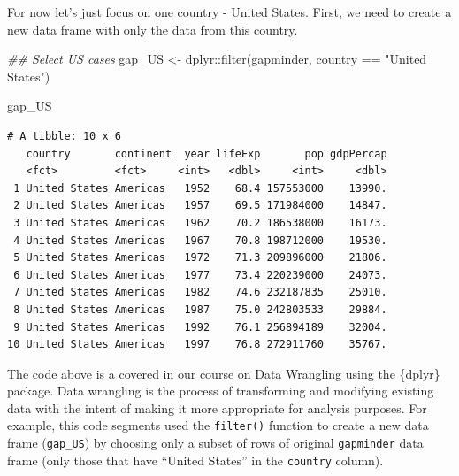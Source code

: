 \documentclass[
  letterpaper,
  DIV=11,
  numbers=noendperiod]{scrreprt}
\newenvironment{Shaded}{\begin{snugshade}}{\end{snugshade}}
\newcommand{\DocumentationTok}[1]{\textcolor[rgb]{0.37,0.37,0.37}{\textit{#1}}}
\newcommand{\FunctionTok}[1]{\textcolor[rgb]{0.28,0.35,0.67}{#1}}
\newcommand{\NormalTok}[1]{\textcolor[rgb]{0.00,0.23,0.31}{#1}}
\newcommand{\OtherTok}[1]{\textcolor[rgb]{0.00,0.23,0.31}{#1}}
\newcommand{\SpecialCharTok}[1]{\textcolor[rgb]{0.37,0.37,0.37}{#1}}
\newcommand{\StringTok}[1]{\textcolor[rgb]{0.13,0.47,0.30}{#1}}
\begin{document}
For now let's just focus on one country - United States. First, we need
to create a new data frame with only the data from this country.

\begin{Shaded}
\begin{Highlighting}[]
\DocumentationTok{\#\# Select US cases}
\NormalTok{gap\_US }\OtherTok{\textless{}{-}}\NormalTok{ dplyr}\SpecialCharTok{::}\FunctionTok{filter}\NormalTok{(gapminder,}
\NormalTok{                        country }\SpecialCharTok{==} \StringTok{"United States"}\NormalTok{)}

\NormalTok{gap\_US}
\end{Highlighting}
\end{Shaded}

\begin{verbatim}
# A tibble: 10 x 6
   country       continent  year lifeExp       pop gdpPercap
   <fct>         <fct>     <int>   <dbl>     <int>     <dbl>
 1 United States Americas   1952    68.4 157553000    13990.
 2 United States Americas   1957    69.5 171984000    14847.
 3 United States Americas   1962    70.2 186538000    16173.
 4 United States Americas   1967    70.8 198712000    19530.
 5 United States Americas   1972    71.3 209896000    21806.
 6 United States Americas   1977    73.4 220239000    24073.
 7 United States Americas   1982    74.6 232187835    25010.
 8 United States Americas   1987    75.0 242803533    29884.
 9 United States Americas   1992    76.1 256894189    32004.
10 United States Americas   1997    76.8 272911760    35767.
\end{verbatim}

\begin{tcolorbox}[enhanced jigsaw, colframe=quarto-callout-note-color-frame, colbacktitle=quarto-callout-note-color!10!white, titlerule=0mm, opacitybacktitle=0.6, breakable, toprule=.15mm, arc=.35mm, rightrule=.15mm, colback=white, bottomrule=.15mm, opacityback=0, toptitle=1mm, left=2mm, bottomtitle=1mm, title=\textcolor{quarto-callout-note-color}{\faInfo}\hspace{0.5em}{Reminder}, leftrule=.75mm, coltitle=black]

The code above is a covered in our course on Data Wrangling using the
\{dplyr\} package. Data wrangling is the process of transforming and
modifying existing data with the intent of making it more appropriate
for analysis purposes. For example, this code segments used the
\texttt{filter()} function to create a new data frame (\texttt{gap\_US})
by choosing only a subset of rows of original \texttt{gapminder} data
frame (only those that have ``United States'' in the \texttt{country}
column).

\end{tcolorbox}
\end{document}
